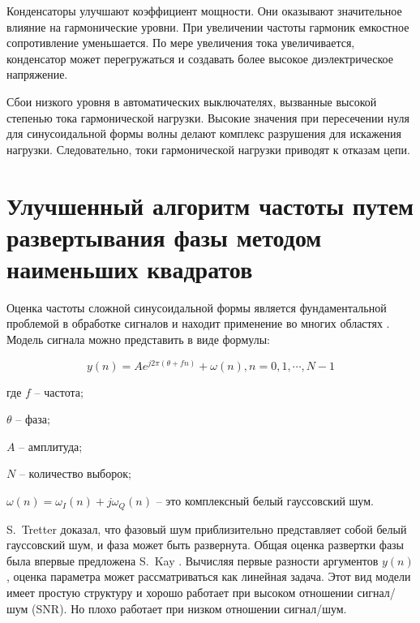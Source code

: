 Конденсаторы улучшают коэффициент мощности. Они оказывают значительное влияние на гармонические уровни. При увеличении частоты гармоник емкостное сопротивление уменьшается. По мере увеличения тока увеличивается, конденсатор может перегружаться и создавать более высокое диэлектрическое напряжение.

Сбои низкого уровня в автоматических выключателях, вызванные высокой степенью тока гармонической нагрузки. Высокие значения при пересечении нуля для синусоидальной формы волны делают комплекс разрушения для искажения нагрузки. Следовательно, токи гармонической нагрузки приводят к отказам цепи.

\section{Улучшенный алгоритм частоты путем развертывания фазы методом наименьших квадратов} \label{sec:ch1/sec5}


Оценка частоты сложной синусоидальной формы является фундаментальной проблемой в обработке сигналов и находит применение во многих областях \cite{zhou2018improved}. Модель сигнала можно представить в виде формулы:

\begin{equation}
	\label{eq:equation1.41}	
	y(n)=Ae^{j2 \pi(\theta+fn)}+ \omega(n), n = 0, 1, \cdots, N-1 
\end{equation}

где $f$  -- частота;

$\theta$ -- фаза;

$A$ -- амплитуда;

$N$ -- количество выборок;

$\omega(n) = \omega_I(n) + j\omega_Q(n)$ -- это комплексный белый гауссовский шум.

S.~Tretter \cite{1057115} доказал, что фазовый шум приблизительно представляет собой белый гауссовский шум, и фаза может быть развернута. 
Общая оценка развертки фазы была впервые предложена  S.~Kay \cite{kay1989fast}. Вычисляя первые разности аргументов $y(n)$, оценка параметра может рассматриваться как линейная задача. 
Этот вид модели имеет простую структуру и хорошо работает при высоком отношении сигнал/шум (SNR). Но плохо работает при низком отношении сигнал/шум.

